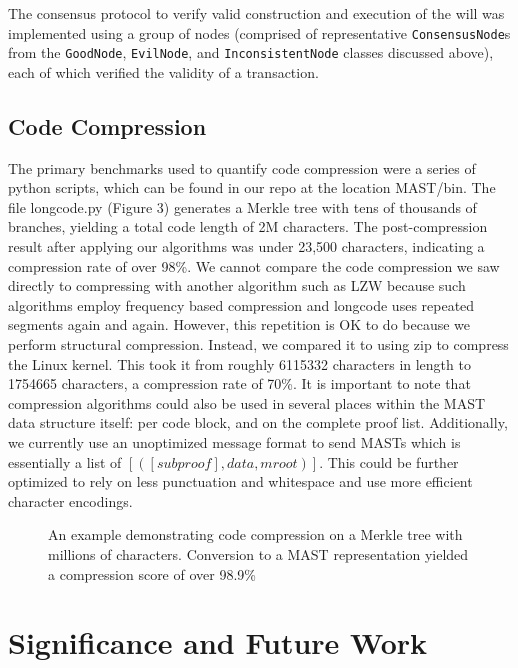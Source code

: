 \documentclass{vldb}
\begin{document}
The consensus protocol to verify valid construction and execution of the will was implemented using a group of nodes (comprised of representative \texttt{ConsensusNode}s from the \texttt{GoodNode}, \texttt{EvilNode}, and \texttt{InconsistentNode} classes discussed above), each of which verified the validity of a transaction.

\subsection{Code Compression}

The primary benchmarks used to quantify code compression were a series of python scripts, which can be found in our repo at the location MAST/bin. The file longcode.py (Figure 3) generates a Merkle tree with tens of thousands of branches, yielding a total code length of 2M characters. The post-compression result after applying our algorithms was under 23,500 characters, indicating a compression rate of over 98\%. We cannot compare the code compression we saw directly to compressing with another algorithm such as LZW because such algorithms employ frequency based compression and longcode uses repeated segments again and again. However, this repetition is OK to do because we perform structural compression. Instead, we compared it to using zip to compress the Linux kernel. This took it from roughly 6115332 characters in length to 1754665 characters, a compression rate of 70\%. It is important to note that compression algorithms could also be used in several places within the MAST data structure itself: per code block, and on the complete proof list. Additionally, we currently use an unoptimized message format to send MASTs which is essentially a list of $[([subproof],data, mroot) ]$. This could be further optimized to rely on less punctuation and whitespace and use more efficient character encodings.

\vfill

\begin{figure}[t!]
	
	\caption{An example demonstrating code compression on a Merkle tree with millions of characters. Conversion to a MAST representation yielded a compression score of over 98.9\%}
           \label{code}
\end{figure}

\section{Significance and Future Work}
\end{document}
